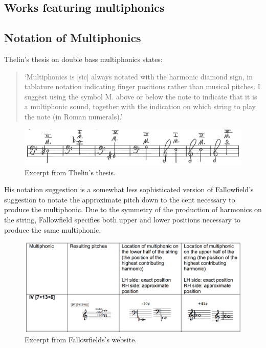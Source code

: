 \subsection{Works featuring multiphonics}

\subsection{Notation of Multiphonics}

Thelin's thesis on double bass multiphonics states:
\begin{quotation}
    `Multiphonics is [sic] always notated with the harmonic diamond sign, in tablature notation
indicating finger positions rather than musical pitches. I suggest using the symbol M. above or
below the note to indicate that it is a multiphonic sound, together with the indication on which
string to play the note (in Roman numerals).'\autocite[6]{thelinMultiphonicsDoubleBass2011}
\end{quotation}

\begin{figure}
    \includegraphics[width=\linewidth]{./resources/thelinMultiphonicNotation.png}
    \caption{Excerpt from Thelin's thesis.}
  \label{fig:Excerpt from Thelin's thesis}
  \end{figure}
His notation suggestion is a somewhat less sophisticated version of Fallowfield's suggestion to notate the approximate pitch down to the cent necessary to produce the multiphonic. Due to the symmetry of the production of harmonics on the string, Fallowfield specifies both upper and lower positions necessary to produce the same multiphonic.\autocite[index/the-string/multiphonics-and-other-multiple-sounds/fingeringcharts.html]{fallowfieldCelloMap}
\begin{figure}
    \includegraphics[width=\linewidth]{./resources/fallowfieldMultiphonicFingering.png}
    \caption{Excerpt from Fallowfields's website.}
\label{fig:Excerpt from Fallowfields's website}
  \end{figure}

